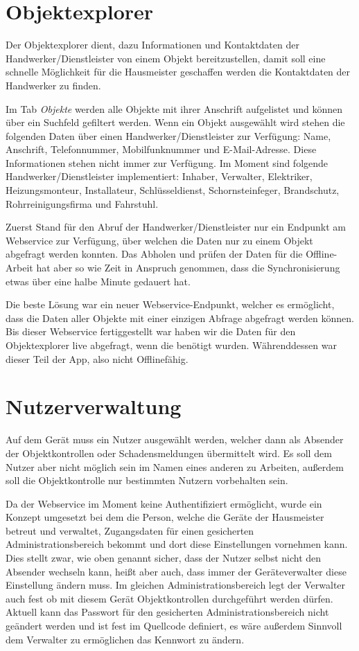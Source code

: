 \documentclass[12pt]{article}
\begin{document}
\section{Objektexplorer}
Der Objektexplorer dient, dazu Informationen und Kontaktdaten der Handwerker/Dienstleister von einem Objekt bereitzustellen, damit soll eine schnelle Möglichkeit für die Hausmeister geschaffen werden die Kontaktdaten der Handwerker zu finden.

Im Tab \textit{Objekte} werden alle Objekte mit ihrer Anschrift aufgelistet und können über ein Suchfeld gefiltert werden. Wenn ein Objekt ausgewählt wird stehen die folgenden Daten über einen Handwerker/Dienstleister zur Verfügung: Name, Anschrift, Telefonnummer, Mobilfunknummer und E-Mail-Adresse. Diese Informationen stehen nicht immer zur Verfügung. Im Moment sind folgende Handwerker/Dienstleister implementiert: Inhaber, Verwalter, Elektriker, Heizungsmonteur, Installateur, Schlüsseldienst, Schornsteinfeger, Brandschutz, Rohrreinigungsfirma und Fahrstuhl.

Zuerst Stand für den Abruf der Handwerker/Dienstleister nur ein Endpunkt am Webservice zur Verfügung, über welchen die Daten nur zu einem Objekt abgefragt werden konnten. Das Abholen und prüfen der Daten für die Offline-Arbeit hat aber so wie Zeit in Anspruch genommen, dass die Synchronisierung etwas über eine halbe Minute gedauert hat.

Die beste Lösung war ein neuer Webservice-Endpunkt, welcher es ermöglicht, dass die Daten aller Objekte mit einer einzigen Abfrage abgefragt werden können. Bis dieser Webservice fertiggestellt war haben wir die Daten für den Objektexplorer live abgefragt, wenn die benötigt wurden. Währenddessen war dieser Teil der App, also nicht Offlinefähig.

\section{Nutzerverwaltung}
Auf dem Gerät muss ein Nutzer ausgewählt werden, welcher dann als Absender der Objektkontrollen oder Schadensmeldungen übermittelt wird. Es soll dem Nutzer aber nicht möglich sein im Namen eines anderen zu Arbeiten, außerdem soll die Objektkontrolle nur bestimmten Nutzern vorbehalten sein.

Da der Webservice im Moment keine Authentifiziert ermöglicht, wurde ein Konzept umgesetzt bei dem die Person, welche die Geräte der Hausmeister betreut und verwaltet, Zugangsdaten für einen gesicherten Administrationsbereich bekommt und dort diese Einstellungen vornehmen kann. Dies stellt zwar, wie oben genannt sicher, dass der Nutzer selbst nicht den Absender wechseln kann, heißt aber auch, dass immer der Geräteverwalter diese Einstellung ändern muss. Im gleichen Administrationsbereich legt der Verwalter auch fest ob mit diesem Gerät Objektkontrollen durchgeführt werden dürfen. Aktuell kann das Passwort für den gesicherten Administrationsbereich nicht geändert werden und ist fest im Quellcode definiert, es wäre außerdem Sinnvoll dem Verwalter zu ermöglichen das Kennwort zu ändern.
\end{document}
